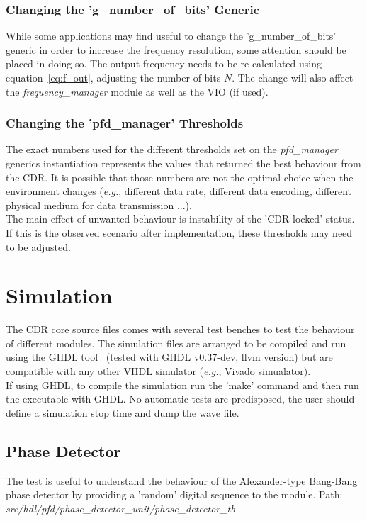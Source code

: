 \documentclass[11pt]{article}
\renewcommand{\>}{\rangle} \renewcommand{\emptyset}{\varnothing}
\begin{document}
\subsubsection{Changing the 'g\_number\_of\_bits' Generic}
While some applications may find useful to change the 'g\_number\_of\_bits'
generic in order to increase the frequency resolution, some attention should be
placed in doing so. The output frequency needs to be re-calculated using
equation~\ref{eq:f_out}, adjusting the number of bits $N$. The change will also
affect the \textit{frequency\_manager} module as well as the VIO (if used).

\subsubsection{Changing the 'pfd\_manager' Thresholds}
The exact numbers used for the different thresholds set on the
\textit{pfd\_manager} generics instantiation represents the values that returned
the best behaviour from the CDR. It is possible that those numbers are not the
optimal choice when the environment changes (\textit{e.g.}, different data rate,
different data encoding, different physical medium for data transmission ...).\\
The main effect of unwanted behaviour is instability of the 'CDR locked' status.
If this is the observed scenario after implementation, these thresholds may need
to be adjusted.

\section{Simulation}
The CDR core source files comes with several test benches to test the behaviour
of different modules. The simulation files are arranged to be compiled and run
using the GHDL tool~\cite{ref:ghdl} (tested with GHDL v0.37-dev, llvm version)
but are compatible
with any other VHDL simulator (\textit{e.g.}, Vivado simualator).\\
If using GHDL, to compile the simulation run the 'make' command and then run the
executable with GHDL. No automatic tests are predisposed, the user should define
a simulation stop time and dump the wave file.

\subsection{Phase Detector}
The test is useful to understand the behaviour of the Alexander-type Bang-Bang
phase detector by providing a 'random' digital sequence to the module.\bigbreak
Path: \textit{src/hdl/pfd/phase\_detector\_unit/phase\_detector\_tb}
\end{document}

